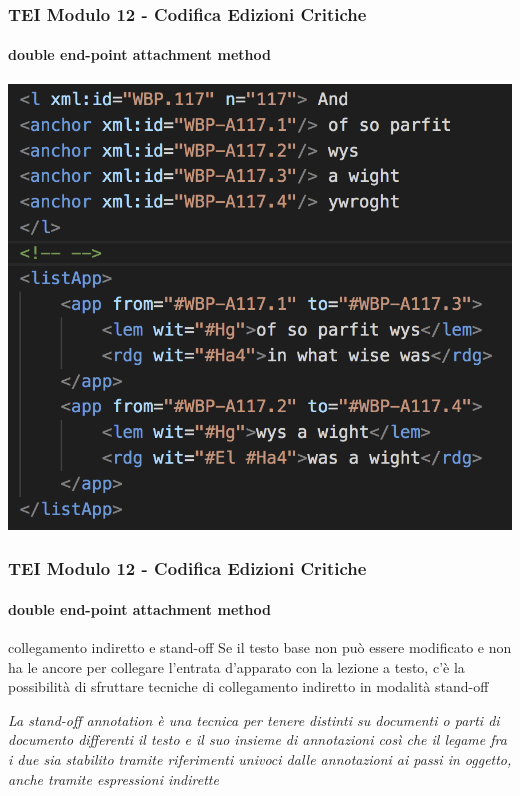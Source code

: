 \begin{frame}
    \frametitle{TEI Modulo 12 - Codifica Edizioni Critiche}
    \framesubtitle{double end-point attachment method}
    \addtocounter{nframe}{1}
   
    \begin{center}
       \includegraphics[width=.95\textwidth]{imgs/end-point-attachment-overlap.png}
    \end{center}

\end{frame}


\begin{frame}
    \frametitle{TEI Modulo 12 - Codifica Edizioni Critiche}
    \framesubtitle{double end-point attachment method}
    \addtocounter{nframe}{1}
    



    \begin{block}{collegamento indiretto e stand-off}
      Se il testo base non può essere modificato e non ha le ancore per collegare l'entrata d'apparato con la lezione a testo, c'è la possibilità di sfruttare tecniche di collegamento indiretto in modalità stand-off
    \end{block}

    \textit{La stand-off annotation è una tecnica per tenere distinti su documenti o parti di documento differenti il testo e il suo insieme di annotazioni così che il legame fra i due sia stabilito tramite riferimenti univoci dalle annotazioni ai passi in oggetto, anche tramite espressioni indirette}

\end{frame}


